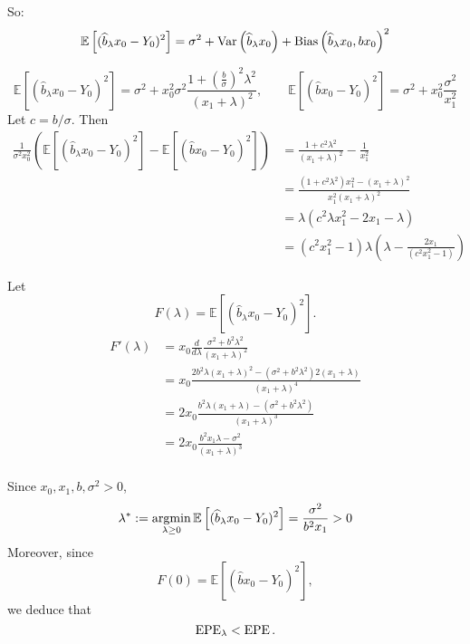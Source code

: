 \documentclass[12pt]{amsart}
\newcommand{\E}[1]{\mathbb{E}\left[#1\right]}
\begin{document}
So:
\[
    \E{(\hat b_\lambda x_0 - Y_0)^2}
    = \sigma^2 + \Var \left(\hat b_\lambda x_0\right) +
    \Bias\left(\hat b_\lambda x_0, bx_0\right)^2
\]

\[
    \E{(\hat b_\lambda x_0 - Y_0)^2} =
    \sigma^2 + x_0^2\sigma^2\frac{1 + (\frac{b}{\sigma})^2\lambda^2}{(x_1 + \lambda)^2},\qquad
    \E{(\hat b x_0 - Y_0)^2} = \sigma^2 + x_0^2\frac{\sigma^2}{x_1^2}
\]
Let $c = b/\sigma$. Then
\begin{align*}
    \frac1{\sigma^2x_0^2}\left(\E{(\hat b_\lambda x_0 - Y_0)^2} 
    - \E{(\hat b x_0 - Y_0)^2}\right)
    &= \frac{1+c^2\lambda^2}{(x_1+\lambda)^2} - \frac1{x_1^2}\\
    &=\frac{(1+c^2\lambda^2)x_1^2 - (x_1+\lambda)^2}{x_1^2(x_1+\lambda)^2}\\
    &=\lambda(c^2\lambda x_1^2 - 2 x_1 - \lambda)\\
    &= (c^2x_1^2 - 1)\lambda\left(\lambda - \frac{2x_1}{(c^2x_1^2 - 1)}\right)
\end{align*}

Let \[F(\lambda) = \E{(\hat b_\lambda x_0 - Y_0)^2}.\]
\begin{align*}
    F'(\lambda) &= x_0\frac d{d\lambda}\frac {\sigma^2 + b^2\lambda^2}{(x_1+\lambda)^2}\\
    &=x_0\frac{2b^2\lambda(x_1+\lambda)^2 
    - (\sigma^2 + b^2\lambda^2)2(x_1 + \lambda)}
    {(x_1+\lambda)^4}\\
    &=2x_0\frac{b^2\lambda(x_1+\lambda) 
    - (\sigma^2 + b^2\lambda^2)}
    {(x_1+\lambda)^3}\\
    &= 2x_0\frac{b^2x_1\lambda - \sigma^2}
    {(x_1+\lambda)^3}\\
\end{align*}

Since $x_0, x_1, b, \sigma^2>0$,
\[
    \lambda^* := \argmin_{\lambda \geq 0} \E{(\hat b_\lambda x_0 - Y_0)^2} = \frac{\sigma^2}{b^2x_1} > 0
\]
Moreover, since
\[
    F(0) = \E{(\hat b x_0 - Y_0)^2},
\]
we deduce that
\[
    \operatorname{EPE}_\lambda < \operatorname{EPE}.
\]
\end{document}
